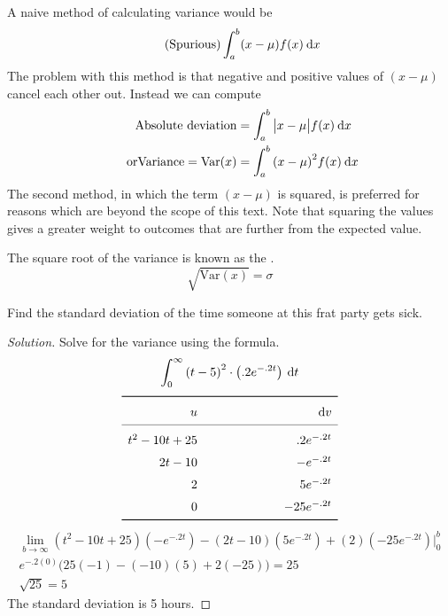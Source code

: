 \documentclass[11pt,leqno,letterpaper]{article}
\begin{document}
A naive method of calculating variance would be
\[
\tag{Spurious}
\int_a^b (x - \mu ) f(x) \:\mathrm{d}x
\]
The problem with this method is that negative and positive values of
$(x- \mu)$ cancel each other out. Instead we can compute
\begin{align*}
\text{Absolute deviation} &=
\int_a^b \big| x - \mu \big| f(x) \:\mathrm{d}x \\
\tag*{or}
\text{Variance} = \text{Var}(x) &= \int_a^b {(x - \mu )}^2 f(x) \:\mathrm{d}x
\end{align*}
The second method, in which the term $(x- \mu)$ is squared,
is preferred for reasons which are beyond the scope of this text.
Note that squaring the values gives a greater weight to outcomes
that are further from the expected value.

The square root of the variance is known as the
.
\[
\tag{Wow!}
\sqrt{\text{Var}(x)} = \sigma
\]

\begin{mdframed}
\begin{problem}
Find the standard deviation of the time
someone at this frat party gets sick.
\begin{proof}[Solution]
Solve for the variance using the formula.
\[
\int_0^{\infty} \left( t-5 \right)^2 \cdot
\left( .2e^{-.2t} \right) \:\mathrm{d}t
\]
\[
{\renewcommand{\arraystretch}{1.5}
\begin{array}{rc @{\hspace*{5 em}} cr}\toprule
u &&& \dv \\\cmidrule{1-4}
t^2-10t+25 &\tikzmark{Left 1} & \tikzmark{Right 1}&.2e^{-.2t} \\
2t-10 &\tikzmark{Left 2} & \tikzmark{Right 2}&-e^{-.2t} \\      
2 &\tikzmark{Left 3} & \tikzmark{Right 3}&5e^{-.2t} \\      
0 &\tikzmark{Left 4} & \tikzmark{Right 4}&-25e^{-.2t} \\
\bottomrule
\end{array}}
\]
%
%
%
\begin{align*}
\lim_{b\to \infty}
\left( t^2-10t+25 \right) \left( -e^{-.2t} \right)
- \left( 2t-10 \right) \left( 5e^{-.2t} \right)
+ \left( 2 \right) \left( -25e^{-.2t} \right)
\bigg|_0^b \\
e^{-.2(0)} \Big(
25(-1) - (-10)(5) +2(-25) \Big) =25 \\
\tag*{Standard deviation is the square root of variance}
\sqrt{25}= 5
\end{align*}
The standard deviation is 5 hours.
\end{proof}
\end{problem}
\end{mdframed}
\end{document}
